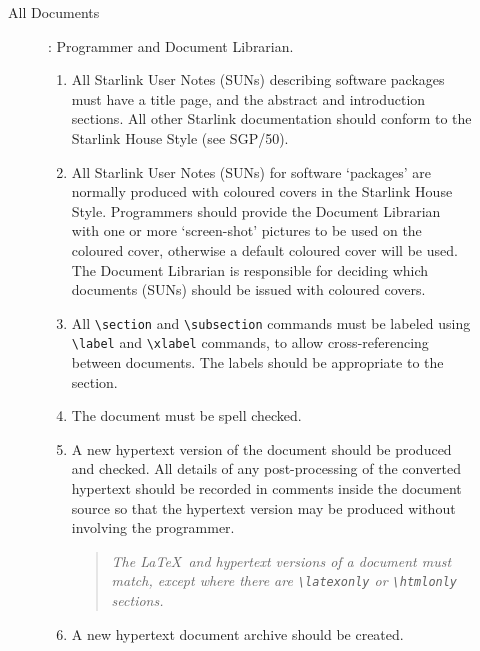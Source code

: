 \documentclass[twoside,11pt]{article}
\newcommand{\xref}[3]{#1}
\newcommand{\xlabel}[1]{}
\begin{document}
\begin{description}
\begin{description}
\begin{enumerate}
\end{enumerate}

\item [All Documents]: Programmer and Document Librarian.

\begin{enumerate}

\item All Starlink User Notes (SUNs) describing software packages  must
have a title page, and the abstract and introduction sections.  All other
Starlink documentation should conform to the Starlink House Style (see
\xref{SGP/50}{sgp50}{}).

\item All Starlink User Notes (SUNs) for software `packages' are normally
produced with coloured covers in the Starlink House Style.  Programmers
should provide the Document Librarian with one or more
`screen-shot' pictures to be used on the coloured cover, otherwise a
default coloured cover will be used.  The Document Librarian is
responsible for deciding which documents (SUNs) should be issued with
coloured covers.

\item All {\verb+\section+} and {\verb+\subsection+} commands must be
labeled using {\verb+\label+} and {\verb+\xlabel+} commands, to allow
cross-referencing between documents.  The labels should be appropriate
to the section.

\item The document must be spell checked.

\item A new hypertext version of the document should be produced and
checked.  All details of any post-processing of the converted hypertext
should be recorded in comments inside the document source so that the
hypertext version may be produced without involving the programmer.

\begin{quote}{\em
The \LaTeX\ and hypertext versions of a document must match, except
where there are {\verb+\latexonly+} or {\verb+\htmlonly+} sections.}
\end{quote}
\item A new hypertext document archive should be created.


\end{enumerate}
\end{description}
\end{description}
\end{document}
